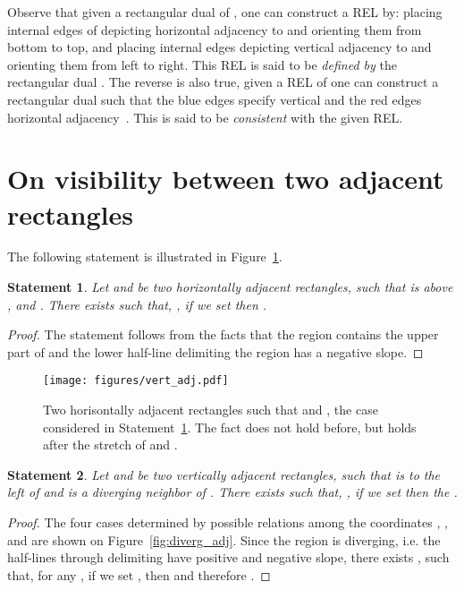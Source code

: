 \documentclass{llncs}
\newtheorem{statement}{Statement}
\begin{document}
Observe that given a rectangular dual   of , one can construct a REL by:   placing internal edges of  depicting horizontal adjacency to   and orienting them from bottom to top, and  placing internal edges depicting vertical adjacency to  and orienting them from left to right. This REL is said to be \emph{defined by} the rectangular dual . The reverse is also true, given a REL of  one can construct a rectangular dual  such that the blue edges specify vertical and the red edges horizontal adjacency~\cite[Theorem~4.3]{He93}. This  is said to be \emph{consistent} with the given REL.


\section{On visibility between two adjacent rectangles}
\label{sec:visibility}

The following statement  is illustrated in Figure~\ref{fig:hor_adj}.
\begin{statement}
\label{stat:horizontal}
Let  and  be two horizontally adjacent rectangles, such that  is above ,   and .  There exists  such that, ,  if we set   then . 
\end{statement} 
\begin{proof}
The statement follows from the facts that  the region   contains the upper part of  and   the lower half-line delimiting the region  has a negative slope.
\end{proof}

\begin{figure}[htb]
\centering
\texttt{[image: figures/vert\_adj.pdf]}
\caption{Two horisontally adjacent rectangles such that  and , the case considered in Statement~\ref{stat:horizontal}. The fact  does not hold before, but holds after the stretch of  and .  }
\label{fig:hor_adj}
\end{figure}

\begin{statement}
\label{stat:diverging}
Let  and  be two vertically adjacent rectangles, such that  is to the left of  and  is a diverging neighbor of .  There exists  such that, ,  if we set   then the . 
\end{statement}
\begin{proof}
The four cases determined by possible relations among the coordinates ,  ,   and   are shown on Figure~\ref{fig:diverg_adj}.
Since the region  is diverging, i.e. the half-lines through  delimiting  have positive and negative slope, there exists , such that, for any , if we set , then  and therefore . 
\end{proof}
\end{document}
